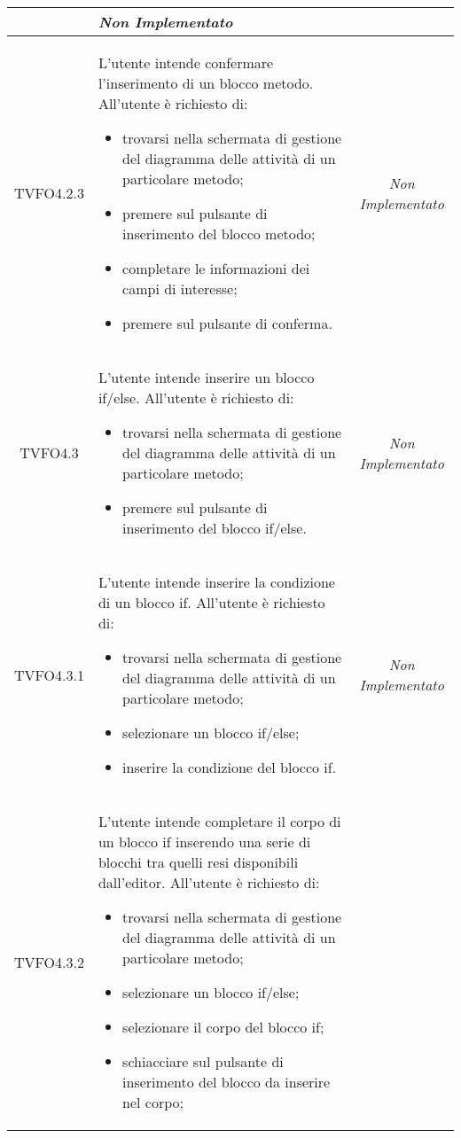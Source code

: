 \begin{longtable}{|c|>{}m{8cm}|c|}
\begin{itemize}
\end{itemize} & \textit{Non Implementato}\\ \hline
\hypertarget{TVFO4.2.3}{TVFO4.2.3} & L'utente intende confermare l'inserimento di un blocco metodo.
All'utente è richiesto di:
\begin{itemize}
	\item trovarsi nella schermata di gestione del diagramma delle attività di un particolare metodo;
	\item premere sul pulsante di inserimento del blocco metodo;
	\item completare le informazioni dei campi di interesse;
	\item premere sul pulsante di conferma.
\end{itemize} & \textit{Non Implementato}\\ \hline
\hypertarget{TVFO4.3}{TVFO4.3} & L'utente intende inserire un blocco if/else.
All'utente è richiesto di:
\begin{itemize}
	\item trovarsi nella schermata di gestione del diagramma delle attività di un particolare metodo;
	\item premere sul pulsante di inserimento del blocco if/else.
\end{itemize} & \textit{Non Implementato}\\ \hline
\hypertarget{TVFO4.3.1}{TVFO4.3.1} & L'utente intende inserire la condizione di un blocco if.
All'utente è richiesto di:
\begin{itemize}
	\item trovarsi nella schermata di gestione del diagramma delle attività di un particolare metodo;
	\item selezionare un blocco if/else;
	\item inserire la condizione del blocco if.
\end{itemize} & \textit{Non Implementato}\\ \hline
\hypertarget{TVFO4.3.2}{TVFO4.3.2} & L'utente intende completare il corpo di un blocco if inserendo una serie di blocchi tra quelli resi disponibili dall'editor.
All'utente è richiesto di:
\begin{itemize}
	\item trovarsi nella schermata di gestione del diagramma delle attività di un particolare metodo;
	\item selezionare un blocco if/else;
	\item selezionare il corpo del blocco if;
	\item schiacciare sul pulsante di inserimento del blocco da inserire nel corpo;

\end{itemize}
\end{longtable}
